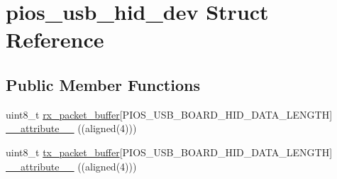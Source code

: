 \hypertarget{structpios__usb__hid__dev}{\section{pios\-\_\-usb\-\_\-hid\-\_\-dev \-Struct \-Reference}
\label{structpios__usb__hid__dev}
}
\subsection*{\-Public \-Member \-Functions}
\begin{DoxyCompactItemize}
\item 
uint8\-\_\-t \hyperlink{group___p_i_o_s___u_s_b___h_i_d_ga20fb92cd6b239abc72cb0ac8b93b11b4}{rx\-\_\-packet\-\_\-buffer}\mbox{[}\-P\-I\-O\-S\-\_\-\-U\-S\-B\-\_\-\-B\-O\-A\-R\-D\-\_\-\-H\-I\-D\-\_\-\-D\-A\-T\-A\-\_\-\-L\-E\-N\-G\-T\-H\mbox{]} \hyperlink{group___p_i_o_s___u_s_b___h_i_d_ga078ed58bf52ceaf8ee4248216c518445}{\-\_\-\-\_\-attribute\-\_\-\-\_\-} ((aligned(4)))
\item 
uint8\-\_\-t \hyperlink{group___p_i_o_s___u_s_b___h_i_d_gad6c7b8ecc0fe215e9d18d6d3281977c6}{tx\-\_\-packet\-\_\-buffer}\mbox{[}\-P\-I\-O\-S\-\_\-\-U\-S\-B\-\_\-\-B\-O\-A\-R\-D\-\_\-\-H\-I\-D\-\_\-\-D\-A\-T\-A\-\_\-\-L\-E\-N\-G\-T\-H\mbox{]} \hyperlink{structpios__usb__hid__dev_ga078ed58bf52ceaf8ee4248216c518445}{\-\_\-\-\_\-attribute\-\_\-\-\_\-} ((aligned(4)))
\end{DoxyCompactItemize}
